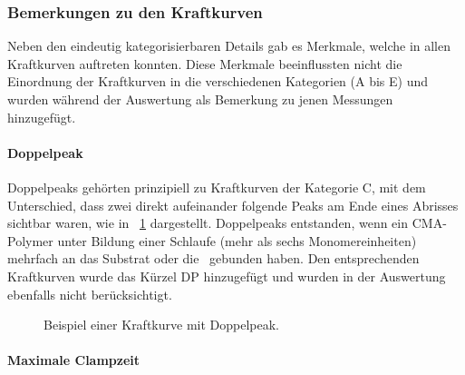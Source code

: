 \subsubsection{Bemerkungen zu den Kraftkurven}
\label{subsubsec:bemerkungen_zu_den_kraftkurven}

Neben den eindeutig kategorisierbaren Details gab es Merkmale, welche in allen Kraftkurven auftreten konnten. Diese Merkmale beeinflussten nicht die Einordnung der Kraftkurven in die verschiedenen Kategorien (A bis E) und wurden während der Auswertung als Bemerkung zu jenen Messungen hinzugefügt.

\paragraph{Doppelpeak}
\label{par:doppelpeak}

Doppelpeaks gehörten prinzipiell zu Kraftkurven der Kategorie C, mit dem Unterschied, dass zwei direkt aufeinander folgende Peaks am Ende eines Abrisses sichtbar waren, wie in \abb~\ref{fig:doppelpeak} dargestellt. Doppelpeaks entstanden, wenn ein \ac{CMA}-Polymer unter Bildung einer Schlaufe (mehr als sechs Monomereinheiten) mehrfach an das Substrat oder die \spitze~gebunden haben. Den entsprechenden Kraftkurven wurde das Kürzel \ac{DP} hinzugefügt und wurden in der Auswertung ebenfalls nicht berücksichtigt.

\begin{figure}[H]
	\centering
	\caption[Beispiel einer Kraftkurve mit Doppelpeak]{Beispiel einer Kraftkurve mit Doppelpeak.}
	\label{fig:doppelpeak}
\end{figure}

\paragraph{Maximale Clampzeit}
\label{par:maximale_clampzeit}

